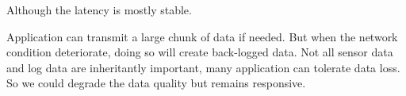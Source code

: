 Although the latency is mostly stable.

Application can transmit a large chunk of data if needed. But when the network
condition deteriorate, doing so will create back-logged data. Not all sensor
data and log data are inheritantly important, many application can tolerate data
loss. So we could degrade the data quality but remains responsive.


